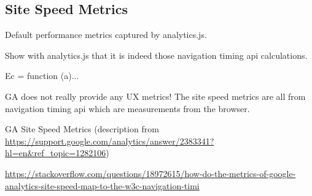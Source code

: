 



\subsection{Site Speed Metrics}

Default performance metrics captured by analytics.js.

Show with analytics.js that it is indeed those navigation timing api calculations.

Ec = function (a)...




GA does not really provide any UX metrics! The site speed metrics are all from navigation timing api which are measurements from the browser.

GA Site Speed Metrics (description from \url{https://support.google.com/analytics/answer/2383341?hl=en&ref_topic=1282106})

\url{https://stackoverflow.com/questions/18972615/how-do-the-metrics-of-google-analytics-site-speed-map-to-the-w3c-navigation-timi}

